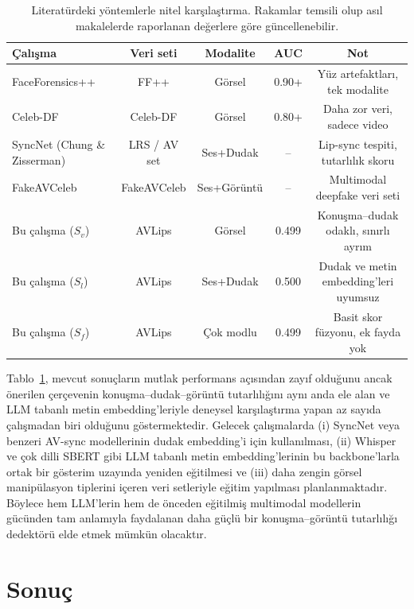\documentclass[conference]{IEEEtran}
\begin{document}
\begin{table}[htbp]
\centering
\caption{Literatürdeki yöntemlerle nitel karşılaştırma. Rakamlar temsili olup asıl makalelerde raporlanan değerlere göre güncellenebilir.}
\label{tab:literature_comparison}
\begin{tabular}{lcccc}
\toprule
Çalışma & Veri seti & Modalite & AUC & Not \\
\midrule
FaceForensics++~\cite{rossler2019faceforensics} & FF++        & Görsel      & 0.90+ & Yüz artefaktları, tek modalite \\
Celeb-DF~\cite{li2020celebdfface}               & Celeb-DF    & Görsel      & 0.80+ & Daha zor veri, sadece video \\
SyncNet (Chung \& Zisserman)~\cite{chung2017voxceleb} & LRS / AV set & Ses+Dudak  & --   & Lip-sync tespiti, tutarlılık skoru \\
FakeAVCeleb~\cite{haldar2024fakeavceleb}        & FakeAVCeleb & Ses+Görüntü & --   & Multimodal deepfake veri seti \\
Bu çalışma ($S_v$)                              & AVLips      & Görsel      & 0.499 & Konuşma--dudak odaklı, sınırlı ayrım \\
Bu çalışma ($S_l$)                              & AVLips      & Ses+Dudak   & 0.500 & Dudak ve metin embedding'leri uyumsuz \\
Bu çalışma ($S_f$)                              & AVLips      & Çok modlu   & 0.499 & Basit skor füzyonu, ek fayda yok \\
\bottomrule
\end{tabular}
\end{table}

Tablo~\ref{tab:literature_comparison}, mevcut sonuçların mutlak performans açısından zayıf olduğunu ancak önerilen çerçevenin konuşma--dudak--görüntü tutarlılığını aynı anda ele alan ve LLM tabanlı metin embedding'leriyle deneysel karşılaştırma yapan az sayıda çalışmadan biri olduğunu göstermektedir. Gelecek çalışmalarda (i) SyncNet veya benzeri AV-sync modellerinin dudak embedding'i için kullanılması, (ii) Whisper ve çok dilli SBERT gibi LLM tabanlı metin embedding'lerinin bu backbone'larla ortak bir gösterim uzayında yeniden eğitilmesi ve (iii) daha zengin görsel manipülasyon tiplerini içeren veri setleriyle eğitim yapılması planlanmaktadır. Böylece hem LLM'lerin hem de önceden eğitilmiş multimodal modellerin gücünden tam anlamıyla faydalanan daha güçlü bir konuşma--görüntü tutarlılığı dedektörü elde etmek mümkün olacaktır.

\section{Sonuç}
\end{document}
